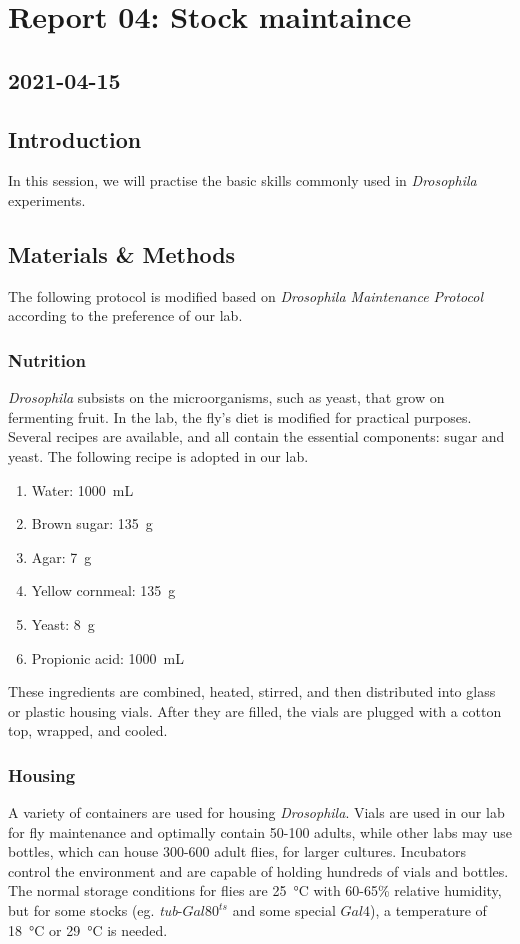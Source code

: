 \newpage
\section{Report 04: Stock maintaince}

\subsection*{2021-04-15}

\subsection{Introduction}
		
In this session, we will practise the basic skills commonly used in \textit{Drosophila} experiments. 
	
\subsection{Materials \& Methods} 
		The following protocol is modified based on \textit{Drosophila Maintenance Protocol} \cite{dros2017} according to the preference of our lab.
	\subsubsection{Nutrition} \textit{Drosophila} subsists on the microorganisms, such as yeast, that grow on fermenting fruit. In the lab, the fly’s diet is modified for practical purposes. Several recipes are available, and all contain the essential components: sugar and yeast. The following recipe is adopted in our lab. 
			\begin{enumerate}
				\item Water: \SI{1000}{\milli\liter}
				\item Brown sugar: \SI{135}{\gram}
				\item Agar: \SI{7}{\gram}
				\item Yellow cornmeal: \SI{135}{\gram}
				\item Yeast: \SI{8}{\gram}
				\item Propionic acid: \SI{1000}{\milli\liter}
			\end{enumerate}
			These ingredients are combined, heated, stirred, and then distributed into glass or plastic housing vials. After they are filled, the vials are plugged with a cotton top, wrapped, and cooled.
			
	\subsubsection{Housing} A variety of containers are used for housing \textit{Drosophila}. Vials are used in our lab for fly maintenance and optimally contain 50-100 adults, while other labs may use bottles, which can house 300-600 adult flies, for larger cultures. Incubators control the environment and are capable of holding hundreds of vials and bottles. The normal storage conditions for flies are \SI{25}{\celsius} with  60-65\% relative humidity, but for some stocks (eg. \textit{tub}-${Gal80}^{ts}$ and some special $Gal4$), a temperature of \SI{18}{\celsius} or \SI{29}{\celsius} is needed.
			

